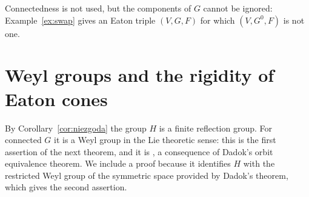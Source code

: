 \documentclass[11pt]{amsart}
\theoremstyle{plain}
\theoremstyle{definition}
\theoremstyle{remark}
\begin{document}
Connectedness is not used, but the components of $G$ cannot be ignored: Example~\ref{ex:swap} gives an Eaton triple $(V,G,F)$ for which $(V,G^0,F)$ is not one.

\section{Weyl groups and the rigidity of Eaton cones}\label{sec:weyl}

By Corollary~\ref{cor:niezgoda} the group $H$ is a finite reflection group. For connected $G$ it is a Weyl group in the Lie theoretic sense: this is the first assertion of the next theorem, and it is \cite[Corollary 4.7]{PT}, a consequence of Dadok's orbit equivalence theorem. We include a proof because it identifies $H$ with the restricted Weyl group of the symmetric space provided by Dadok's theorem, which gives the second assertion.
\end{document}
